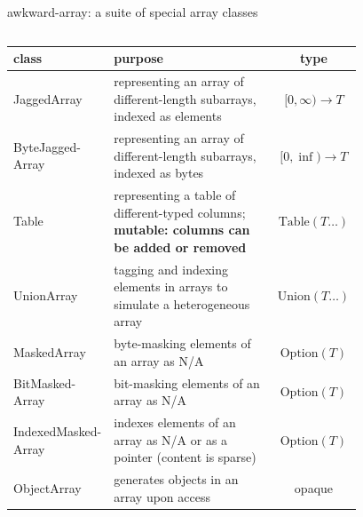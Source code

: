 \documentclass[aspectratio=169]{beamer}
\begin{document}
\begin{frame}{awkward-array: a suite of special array classes}
\scriptsize
\vspace{0.45 cm}
\begin{columns}[t]
\begin{tabular}{p{0.23\linewidth} p{0.55\linewidth} c}
class & purpose & type \\\hline
JaggedArray & representing an array of different-length subarrays, indexed as elements & $[0, \infty) \to T$ \\
ByteJagged- \mbox{\hspace{0.35 cm}Array} & representing an array of different-length subarrays, indexed as bytes & $[0, \inf) \to T$ \\
Table & representing a table of different-typed columns; {\bf mutable: columns can be added or removed} & $\mbox{Table}(T\ldots)$ \\
UnionArray & tagging and indexing elements in arrays to simulate a heterogeneous array & $\mbox{Union}(T\ldots)$ \\
MaskedArray & byte-masking elements of an array as N/A & $\mbox{Option}(T)$ \\
BitMasked- \mbox{\hspace{0.35 cm}Array} & bit-masking elements of an array as N/A & $\mbox{Option}(T)$ \\
IndexedMasked- \mbox{\hspace{0.35 cm}Array} & indexes elements of an array as N/A or as a pointer (content is sparse) & $\mbox{Option}(T)$ \\
ObjectArray & generates objects in an array upon access & opaque\vspace{0.33 cm} \\
\end{tabular}


\end{columns}
\end{frame}
\end{document}

